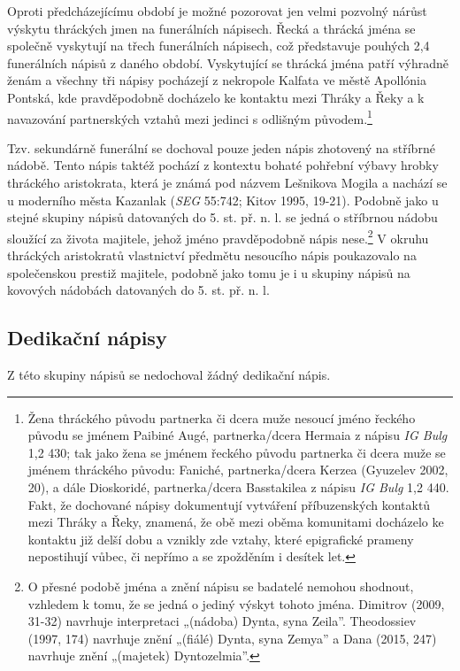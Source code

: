 Oproti předcházejícímu období je možné pozorovat jen velmi pozvolný nárůst výskytu thráckých jmen na funerálních nápisech. Řecká a thrácká jména se společně vyskytují na třech funerálních nápisech, což představuje pouhých 2,4  funerálních nápisů z daného období. Vyskytující se thrácká jména patří výhradně ženám a všechny tři nápisy pocházejí z nekropole Kalfata ve městě Apollónia Pontská, kde pravděpodobně docházelo ke kontaktu mezi Thráky a Řeky a k navazování partnerských vztahů mezi jedinci s odlišným původem.\footnote{Žena thráckého původu partnerka či dcera muže nesoucí jméno řeckého původu se jménem Paibiné Augé, partnerka/dcera Hermaia z nápisu {\em IG Bulg} 1,2 430; tak jako žena se jménem řeckého původu partnerka či dcera muže se jménem thráckého původu: Faniché, partnerka/dcera Kerzea (Gyuzelev 2002, 20), a dále Dioskoridé, partnerka/dcera Basstakilea z nápisu {\em IG Bulg} 1,2 440. Fakt, že dochované nápisy dokumentují vytváření příbuzenských kontaktů mezi Thráky a Řeky, znamená, že obě mezi oběma komunitami docházelo ke kontaktu již delší dobu a vznikly zde vztahy, které epigrafické prameny nepostihují vůbec, či nepřímo a se zpožděním i desítek let.}

Tzv. sekundárně funerální se dochoval pouze jeden nápis zhotovený na stříbrné nádobě. Tento nápis taktéž pochází z kontextu bohaté pohřební výbavy hrobky thráckého aristokrata, která je známá pod názvem Lešnikova Mogila a nachází se u moderního města Kazanlak ({\em SEG} 55:742; Kitov 1995, 19-21). Podobně jako u stejné skupiny nápisů datovaných do 5. st. př. n. l. se jedná o stříbrnou nádobu sloužící za života majitele, jehož jméno pravděpodobně nápis nese.\footnote{O přesné podobě jména a znění nápisu se badatelé nemohou shodnout, vzhledem k tomu, že se jedná o jediný výskyt tohoto jména. Dimitrov (2009, 31-32) navrhuje interpretaci „(nádoba) Dynta, syna Zeila”. Theodossiev (1997, 174) navrhuje znění „(fiálé) Dynta, syna Zemya” a Dana (2015, 247) navrhuje znění „(majetek) Dyntozelmia”.} V okruhu thráckých aristokratů vlastnictví předmětu nesoucího nápis poukazovalo na společenskou prestiž majitele, podobně jako tomu je i u skupiny nápisů na kovových nádobách datovaných do 5. st. př. n. l.

\subsection[dedikační-nápisy-2]{Dedikační nápisy}

Z této skupiny nápisů se nedochoval žádný dedikační nápis.

